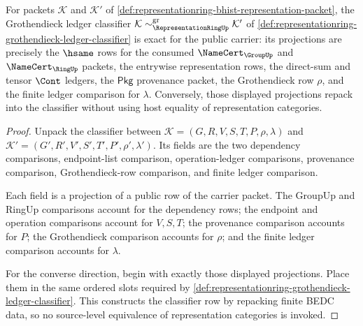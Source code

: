 \begin{theorem}
\label{thm:representationring-classifier-exactness}
For packets $\mathcal{K}$ and $\mathcal{K}'$ of
\autoref{def:representationring-bhist-representation-packet}, the
Grothendieck ledger classifier
$\mathcal{K}\sim_{\RepresentationRingUp}^{\mathrm{gr}}\mathcal{K}'$ of
\autoref{def:representationring-grothendieck-ledger-classifier} is exact for
the public carrier: its projections are precisely the $\hsame$ rows for the
consumed $\NameCert_{\GroupUp}$ and $\NameCert_{\RingUp}$ packets, the
entrywise representation rows, the direct-sum and tensor $\Cont$ ledgers, the
$\mathsf{Pkg}$ provenance packet, the Grothendieck row $\rho$, and the
finite ledger comparison for $\lambda$. Conversely, those displayed
projections repack into the classifier without using host equality of
representation categories.
\end{theorem}
\begin{proof}
Unpack the classifier between
$\mathcal{K}=(G,R,V,S,T,P,\rho,\lambda)$ and
$\mathcal{K}'=(G',R',V',S',T',P',\rho',\lambda')$. Its fields are the two
dependency comparisons, endpoint-list comparison, operation-ledger
comparisons, provenance comparison, Grothendieck-row comparison, and finite
ledger comparison.

Each field is a projection of a public row of the carrier packet. The GroupUp
and RingUp comparisons account for the dependency rows; the endpoint and
operation comparisons account for $V,S,T$; the provenance comparison accounts
for $P$; the Grothendieck comparison accounts for $\rho$; and the finite
ledger comparison accounts for $\lambda$.

For the converse direction, begin with exactly those displayed projections.
Place them in the same ordered slots required by
\autoref{def:representationring-grothendieck-ledger-classifier}. This
constructs the classifier row by repacking finite BEDC data, so no
source-level equivalence of representation categories is invoked.
\end{proof}

